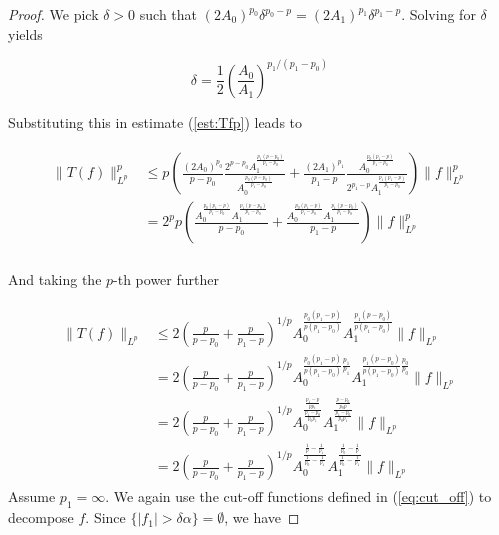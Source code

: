 \begin{proof}
		We pick $\delta > 0$ such that $\left(2A_0\right)^{p_0}\delta^{p_0 - p} = \left(2A_1\right)^{p_1}\delta^{p_1 - p}$. Solving for $\delta$ yields 

		\begin{equation}
			\delta = \frac{1}{2} \left( \frac{A_0}{A_1}\right)^{p_1/(p_1 - p_0)}
		\end{equation}

		Substituting this in estimate (\ref{est:Tfp}) leads to

		\begin{gather}
			\begin{aligned}
				\|T(f)\|_{L^p}^p &\leq p\left( \frac{(2A_0)^{p_0}}{p - p_0}\frac{2^{p - p_0}A_1^\frac{p_1(p-p_0)}{p_1-p_0}}{A_0^\frac{p_0(p-p_0)}{p_1 - p_0}} + \frac{(2A_1)^{p_1}}{p_1 - p} \frac{A_0^\frac{p_0(p_1 - p)}{p_1 - p_0}}{2^{p_1 - p}A_1^\frac{p_1(p_1 - p)}{p_1 - p_0}} \right)\|f\|_{L^p}^p\\
				&=  2^pp\left( \frac{A_0^\frac{p_0(p_1 - p)}{p_1 - p_0}A_1^\frac{p_1(p-p_0)}{p_1-p_0}}{p - p_0} + \frac{A_0^\frac{p_0(p_1 - p)}{p_1 - p_0}A_1^\frac{p_1(p - p_0)}{p_1 - p_0}}{p_1- p} \right)\|f\|_{L^p}^p\\
			\end{aligned}
		\end{gather}

		And taking the $p$-th power further

		\begin{gather}
			\begin{aligned}
				\|T(f)\|_{L^p} &\leq 2\left( \frac{p}{p - p_0} + \frac{p}{p_1- p} \right)^{1/p} A_0^\frac{p_0(p_1 - p)}{p(p_1 - p_0)}A_1^\frac{p_1(p - p_0)}{p(p_1 - p_0)}\|f\|_{L^p}\\
				&= 2\left( \frac{p}{p - p_0} + \frac{p}{p_1- p} \right)^{1/p} A_0^{\frac{p_0(p_1 - p)}{p(p_1 - p_0)}\frac{p_1}{p_1}}A_1^{\frac{p_1(p - p_0)}{p(p_1 - p_0)}\frac{p_0}{p_0}}\|f\|_{L^p}\\
				&= 2\left( \frac{p}{p - p_0} + \frac{p}{p_1- p} \right)^{1/p} A_0^{\frac{\frac{p_1 - p}{pp_1}}{\frac{p_1 - p_0}{p_0p_1}}}A_1^{\frac{\frac{p - p_0}{p_0p}}{\frac{p_1 - p_0}{p_0p_1}}}\|f\|_{L^p}\\
				&= 2\left( \frac{p}{p - p_0} + \frac{p}{p_1- p} \right)^{1/p} A_0^{\frac{\frac{1}{p} - \frac{1}{p_1}}{\frac{1}{p_0} - \frac{1}{p_1}}}A_1^{\frac{\frac{1}{p_0} - \frac{1}{p}}{\frac{1}{p_0} - \frac{1}{p_1}}}\|f\|_{L^p}
			\end{aligned}
		\end{gather}
		Assume \underline{$p_1 = \infty$}. We again use the cut-off functions defined in (\ref{eq:cut_off}) to decompose $f$.  Since $\{\vert f_1\vert > \delta\alpha \} = \emptyset$, we have 


\end{proof}
